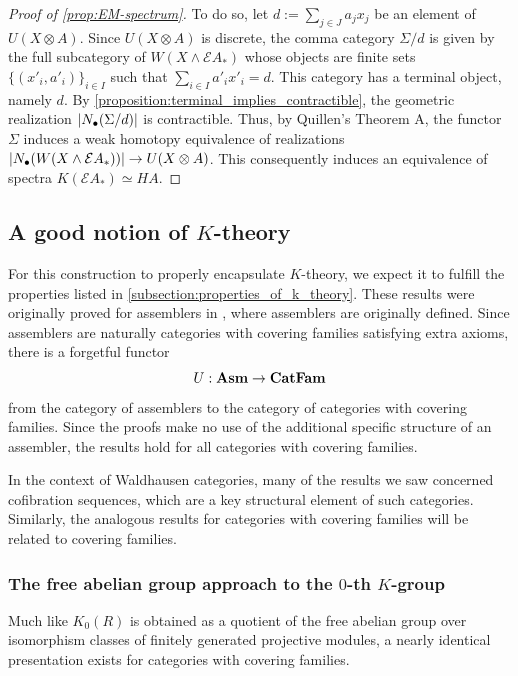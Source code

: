 \begin{proof}[Proof of \cref{prop:EM-spectrum}]
    To do so, let $d := \sum_{j \in J} a_j x_j$ be an element of $U(X \otimes A)$. Since $U(X \otimes A)$ is discrete, the comma category $\Sigma / d$ is  given by the full subcategory of $W(X \wedge \mathcal{E} A_*)$ whose objects are finite sets $\{(x'_i, a'_i)\}_{i \in I}$ such that $\sum_{i \in I} a'_i x'_i = d$. This category has a terminal object, namely $d$. By \cref{proposition:terminal_implies_contractible}, the geometric realization $\left| N_{\bullet}(\Sigma / d) \right|$ is contractible. Thus, by Quillen's Theorem A, the functor $\Sigma$ induces a weak homotopy equivalence of realizations $\left| N_{\bullet}(W(X \wedge \mathcal{E} A_*)) \right| \to U(X \otimes A)$. This consequently induces an equivalence of spectra $K(\mathcal{E} A_*) \simeq H A$.
    
\end{proof}

\subsection[A good notion of K-theory]{A good notion of $K$-theory}
For this construction to properly encapsulate $K$-theory, we expect it to fulfill the properties listed in \cref{subsection:properties_of_k_theory}. These results were originally proved for assemblers in \cite{zakharevich2016ktheoryassemblers}, where assemblers are originally defined. Since assemblers are naturally categories with covering families satisfying extra axioms, there is a forgetful functor
\[ U : \textbf{Asm} \to \textbf{CatFam}\]
from the category of assemblers to the category of categories with covering families. Since the proofs make no use of the additional specific structure of an assembler, the results hold for all categories with covering families.

In the context of Waldhausen categories, many of the results we saw concerned cofibration sequences, which are a key structural element of such categories. Similarly, the analogous results for categories with covering families will be related to covering families.

\subsubsection[The free abelian group approach to the 0-th K-group]{The free abelian group approach to the $0$-th $K$-group}
Much like $K_0(R)$ is obtained as a quotient of the free abelian group over isomorphism classes of finitely generated projective modules, a nearly identical presentation exists for categories with covering families.

